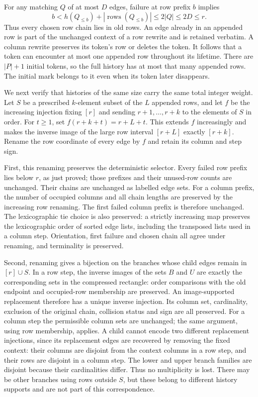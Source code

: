 For any matching $Q$ of at most $D$ edges, failure at row prefix $b$
implies
\[
 b< h(Q_{\leq b})+
       |\operatorname{rows}(Q_{\leq b})|\leq 2|Q|\leq2D\leq r.
\]
Thus every chosen row chain lies in old rows.  An edge already in an
appended row is part of the unchanged context of a row rewrite and is
retained verbatim.  A column rewrite preserves its token's row or
deletes the token.  It follows that a token can encounter at most one
appended row throughout its lifetime.  There are $|P|+1$ initial tokens,
so the full history has at most that many appended rows.  The initial
mark belongs to it even when its token later disappears.

We next verify that histories of the same size carry the same total
integer weight.  Let $S$ be a prescribed $k$-element subset of the $L$
appended rows, and let $f$ be the increasing injection fixing $[r]$ and
sending $r+1,\ldots,r+k$ to the elements of $S$ in order.  For $t\geq1$, set $f(r+k+t)=r+L+t$.
This extends $f$ increasingly and makes the inverse image of the large
row interval $[r+L]$ exactly $[r+k]$.  Rename the row coordinate of every
edge by $f$ and retain its column and step sign.

First, this renaming preserves the deterministic selector.  Every failed
row prefix lies below $r$, as just proved; those prefixes and their
unused-row counts are unchanged.  Their chains are unchanged as labelled
edge sets.  For a column prefix, the number of occupied columns and all
chain lengths are preserved by the increasing row renaming.  The first
failed column prefix is therefore unchanged.  The lexicographic tie
choice is also preserved: a strictly increasing map preserves the
lexicographic order of sorted edge lists, including the transposed lists
used in a column step.  Orientation, first failure and chosen chain all
agree under renaming, and terminality is preserved.

Second, renaming gives a bijection on the branches whose child edges
remain in $[r]\cup S$.  In a row step, the inverse images of the sets
$B$ and $U$ are exactly the corresponding sets in the compressed
rectangle: order comparisons with the old endpoint and occupied-row
membership are preserved.  An image-supported replacement therefore
has a unique inverse injection.  Its column set, cardinality, exclusion
of the original chain, collision status and sign are all preserved.
For a column step the permissible column sets are unchanged; the same
argument, using row membership, applies.  A child cannot encode two
different replacement injections, since its replacement edges are
recovered by removing the fixed context: their columns are disjoint
from the context columns in a row step, and their rows are disjoint
in a column step.  The lower and upper branch families are disjoint
because their cardinalities differ.  Thus no multiplicity is lost.
There may be other branches using rows outside $S$, but these belong to
different history supports and are not part of this correspondence.

